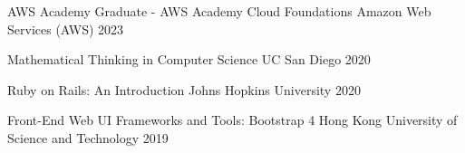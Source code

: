 

\begin{cvhonors}

  \cvhonor
    {AWS Academy Graduate - AWS Academy Cloud Foundations} %
    {Amazon Web Services (AWS)} %
    {} %
    {2023} %
  
  \cvhonor
    {Mathematical Thinking in Computer Science} %
    {UC San Diego} %
    {} %
    {2020} %

  \cvhonor
    {Ruby on Rails: An Introduction} %
    {Johns Hopkins University} %
    {} %
    {2020} %

  \cvhonor
    {Front-End Web UI Frameworks and Tools: Bootstrap 4} %
    {Hong Kong University of Science and Technology} %
    {} %
    {2019} %
\end{cvhonors}